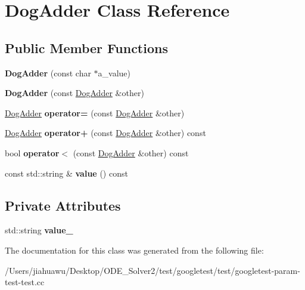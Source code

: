 \hypertarget{class_dog_adder}{}\section{Dog\+Adder Class Reference}
\label{class_dog_adder}
\subsection*{Public Member Functions}
\begin{DoxyCompactItemize}
\item 
\mbox{\label{class_dog_adder_a7fd76a2078834dc255c7dd7ac7c58f32}} 
{\bfseries Dog\+Adder} (const char $\ast$a\+\_\+value)
\item 
\mbox{\label{class_dog_adder_a35bb24b649b63f38784dcb44d55c4d94}} 
{\bfseries Dog\+Adder} (const \mbox{\hyperlink{class_dog_adder}{Dog\+Adder}} \&other)
\item 
\mbox{\label{class_dog_adder_a13bd773069c15b083f876b8afd512247}} 
\mbox{\hyperlink{class_dog_adder}{Dog\+Adder}} {\bfseries operator=} (const \mbox{\hyperlink{class_dog_adder}{Dog\+Adder}} \&other)
\item 
\mbox{\label{class_dog_adder_ad667166cdafb4352396e910faf09a55f}} 
\mbox{\hyperlink{class_dog_adder}{Dog\+Adder}} {\bfseries operator+} (const \mbox{\hyperlink{class_dog_adder}{Dog\+Adder}} \&other) const
\item 
\mbox{\label{class_dog_adder_a6d87d3ee06c0167e7552ba83daa629e7}} 
bool {\bfseries operator$<$} (const \mbox{\hyperlink{class_dog_adder}{Dog\+Adder}} \&other) const
\item 
\mbox{\label{class_dog_adder_a76bb9e42f79e9d4adacd9e48a3a3c9fb}} 
const std\+::string \& {\bfseries value} () const
\end{DoxyCompactItemize}
\subsection*{Private Attributes}
\begin{DoxyCompactItemize}
\item 
\mbox{\label{class_dog_adder_ac539b2207c940d290ed9b88211badce9}} 
std\+::string {\bfseries value\+\_\+}
\end{DoxyCompactItemize}


The documentation for this class was generated from the following file\+:\begin{DoxyCompactItemize}
\item 
/\+Users/jiahuawu/\+Desktop/\+O\+D\+E\+\_\+\+Solver2/test/googletest/test/googletest-\/param-\/test-\/test.\+cc\end{DoxyCompactItemize}
